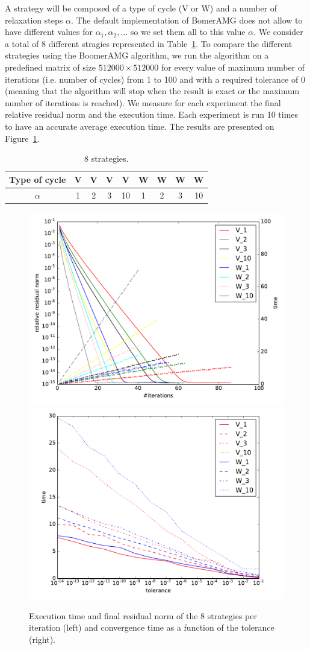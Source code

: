 \documentclass[10pt,conference]{IEEEtran}
\begin{document}
A strategy will be composed of a type of cycle (V or W) and a number of relaxation steps $\alpha$. The default implementation of BomerAMG does not allow to have different values
for $\alpha_1,\alpha_2,\dots$ so we set them all to this value $\alpha$. We consider a total of 8 different stragies represented in Table~\ref{table.strat1}.
To compare the different strategies using the BoomerAMG algorithm, we run the algorithm on a predefined matrix of size $512000 \times 512000$ for every
value of maximum number of iterations (i.e. number of cycles) from 1 to 100 and with a required tolerance of $0$ (meaning
that the algorithm will stop when the result is exact or the maximum number of iterations is reached). We measure for each experiment the final relative residual norm and the execution time. Each experiment is run 10 times to have an accurate average execution time.
The results are presented on Figure~\ref{fig.first_tests}.

\begin{table}

\begin{center}
 \begin{tabular}{|c|c|c|c|c|c|c|c|c|}
   \hline
   Type of cycle & V & V & V & V & W & W & W & W \\
   \hline
   $\alpha$ & 1 & 2 & 3 & 10 & 1 & 2 & 3 & 10 \\
   \hline
 \end{tabular}
\end{center}
 \caption{8 strategies.}
 \label{table.strat1}

\end{table}


\begin{figure}
  \includegraphics[width=0.49\linewidth]{figs/convergence_1.pdf}
  \includegraphics[width=0.49\linewidth]{figs/time_convergence.pdf}
  \caption{Execution time and final residual norm of the 8 strategies per iteration (left) and convergence time as a function of the tolerance (right).}
  \label{fig.first_tests}
\end{figure}
\end{document}
